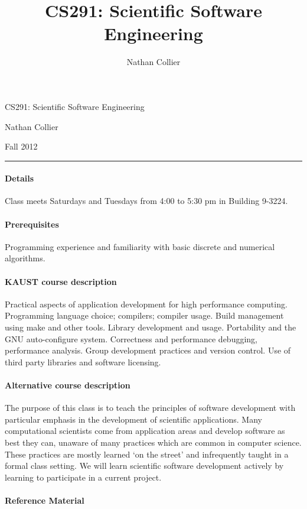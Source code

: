\documentclass[12 pt]{article}
\title{CS291: Scientific Software Engineering}
\author{Nathan Collier}
\begin{document}
{\large 
  \begin{flushleft}
    CS291: Scientific Software Engineering

    Nathan Collier
    
    Fall 2012
    
    \rule{\linewidth}{0.25mm}
\end{flushleft}}

\paragraph{Details} Class meets Saturdays and Tuesdays from 4:00 to 5:30 pm in Building 9-3224. 

\paragraph{Prerequisites} Programming experience and familiarity with basic discrete and numerical algorithms.

\paragraph{KAUST course description}

Practical aspects of application development for high performance
computing. Programming language choice; compilers; compiler
usage. Build management using make and other tools. Library
development and usage. Portability and the GNU auto-configure
system. Correctness and performance debugging, performance
analysis. Group development practices and version control. Use of
third party libraries and software licensing.

\paragraph{Alternative course description}

The purpose of this class is to teach the principles of software
development with particular emphasis in the development of scientific
applications. Many computational scientists come from application
areas and develop software as best they can, unaware of many practices
which are common in computer science. These practices are mostly
learned `on the street' and infrequently taught in a formal class
setting. We will learn scientific software development actively by
learning to participate in a current project.

\paragraph{Reference Material}
\end{document}

